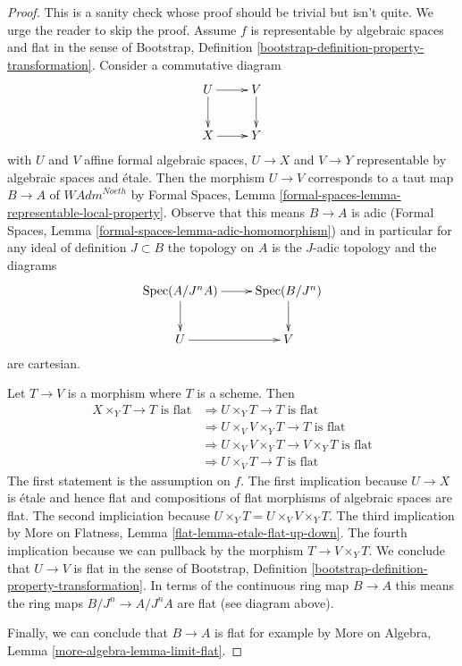 \documentclass[10pt,a4paper]{amsart}
\theoremstyle{plain}
\theoremstyle{definition}
\theoremstyle{remark}
\numberwithin{equation}{subsection}
\def\Spec{\mathop{\mathrm{Spec}}}
\begin{document}
\begin{proof}
This is a sanity check whose proof should be trivial but isn't quite.
We urge the reader to skip the proof.
Assume $f$ is representable by algebraic spaces and
flat in the sense of Bootstrap, Definition
\ref{bootstrap-definition-property-transformation}.
Consider a commutative diagram
$$
\xymatrix{
U \ar[d] \ar[r] & V \ar[d] \\
X \ar[r] & Y
}
$$
with $U$ and $V$ affine formal algebraic spaces, $U \to X$ and $V \to Y$
representable by algebraic spaces and \'etale.
Then the morphism $U \to V$
corresponds to a taut map $B \to A$ of $\textit{WAdm}^{Noeth}$ by
Formal Spaces, Lemma
\ref{formal-spaces-lemma-representable-local-property}.
Observe that this means $B \to A$ is adic (Formal Spaces, Lemma
\ref{formal-spaces-lemma-adic-homomorphism})
and in particular for any ideal of definition $J \subset B$
the topology on $A$ is the $J$-adic topology and the diagrams
$$
\xymatrix{
\Spec(A/J^nA) \ar[r] \ar[d] & \Spec(B/J^n) \ar[d] \\
U \ar[r] & V
}
$$
are cartesian.

\medskip\noindent
Let $T \to V$ is a morphism where $T$ is a scheme. Then
\begin{align*}
X \times_Y T \to T\text{ is flat}
& \Rightarrow
U \times_Y T \to T\text{ is flat} \\
& \Rightarrow
U \times_V V \times_Y T \to T\text{ is flat} \\
& \Rightarrow
U \times_V V \times_Y T \to V \times_Y T\text{ is flat} \\
& \Rightarrow
U \times_V T \to T\text{ is flat}
\end{align*}
The first statement is the assumption on $f$.
The first implication because $U \to X$ is \'etale and hence flat
and compositions of flat morphisms of algebraic spaces are flat.
The second impliciation because $U \times_Y T = U \times_V V \times_Y T$.
The third implication by
More on Flatness, Lemma \ref{flat-lemma-etale-flat-up-down}.
The fourth implication because we can pullback by the morphism
$T \to V \times_Y T$.
We conclude that $U \to V$ is flat in the sense of
Bootstrap, Definition
\ref{bootstrap-definition-property-transformation}.
In terms of the continuous ring map $B \to A$
this means the ring maps $B/J^n \to A/J^nA$ are flat (see diagram above).

\medskip\noindent
Finally, we can conclude that $B \to A$ is flat for example
by More on Algebra, Lemma \ref{more-algebra-lemma-limit-flat}.
\end{proof}
\end{document}
